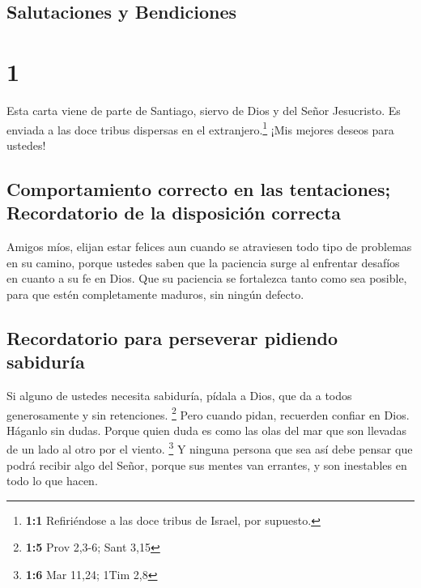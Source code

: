 \hypertarget{salutaciones-y-bendiciones}{%
\subsection{Salutaciones y
Bendiciones}\label{salutaciones-y-bendiciones}}

\hypertarget{section}{%
\section{1}\label{section}}

 Esta carta viene de parte de Santiago, siervo de Dios y
del Señor Jesucristo. Es enviada a las doce tribus dispersas en el
extranjero.\footnote{\textbf{1:1} Refiriéndose a las doce tribus de
  Israel, por supuesto.} ¡Mis mejores deseos para ustedes!

\hypertarget{comportamiento-correcto-en-las-tentaciones-recordatorio-de-la-disposiciuxf3n-correcta}{%
\subsection{Comportamiento correcto en las tentaciones; Recordatorio de
la disposición
correcta}\label{comportamiento-correcto-en-las-tentaciones-recordatorio-de-la-disposiciuxf3n-correcta}}

 Amigos míos, elijan estar felices aun cuando se
atraviesen todo tipo de problemas en su camino,  porque
ustedes saben que la paciencia surge al enfrentar desafíos en cuanto a
su fe en Dios.  Que su paciencia se fortalezca tanto como
sea posible, para que estén completamente maduros, sin ningún defecto.

\hypertarget{recordatorio-para-perseverar-pidiendo-sabiduruxeda}{%
\subsection{Recordatorio para perseverar pidiendo
sabiduría}\label{recordatorio-para-perseverar-pidiendo-sabiduruxeda}}

 Si alguno de ustedes necesita sabiduría, pídala a Dios,
que da a todos generosamente y sin retenciones. \footnote{\textbf{1:5}
  Prov 2,3-6; Sant 3,15}  Pero cuando pidan, recuerden
confiar en Dios. Háganlo sin dudas. Porque quien duda es como las olas
del mar que son llevadas de un lado al otro por el viento. \footnote{\textbf{1:6}
  Mar 11,24; 1Tim 2,8}  Y ninguna persona que sea así debe
pensar que podrá recibir algo del Señor,  porque sus
mentes van errantes, y son inestables en todo lo que hacen.

